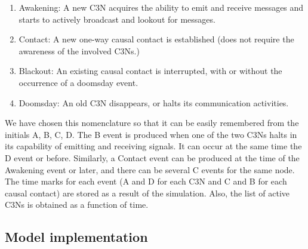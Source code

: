 \documentclass[crop]{CSLB}
\newcommand{\ceti}{C3N}
\newcommand{\cetis}{C3Ns}
\newcommand{\blackout}{B event }
\newcommand{\doomsday}{D event }
\newcommand{\aawakening}{Awakening event }
\newcommand{\ccontact}{Contact event }
\newcommand{\contacts}{C events }
\begin{document}
\begin{enumerate}
   \item[(A)] Awakening: A new \ceti{} acquires the ability to emit
      and receive messages and starts to actively broadcast and
      lookout for messages.
   \item[(C)] Contact: A new one-way causal contact is established
      (does not require the awareness of the involved \cetis{}.)
   \item[(B)] Blackout: An existing causal contact is interrupted,
      with or without the occurrence of a doomsday event.
   \item[(D)] Doomsday: An old \ceti{} disappears, or halts its
      communication activities.
\end{enumerate}

We have chosen this nomenclature so that it can be easily remembered
from the initials A, B, C, D.
%
The \blackout is produced when one of the two \cetis{} halts in its
capability of emitting and receiving signals.
%
It can occur at the same time the \doomsday or before.
%
Similarly, a \ccontact can be produced at the time of the \aawakening
or later, and there can be several \contacts for the same node.
%
The time marks for each event (A and D for each \ceti{} and C and B
for each causal contact) are stored as a result of the simulation.
%
Also, the list of active \cetis{} is obtained as a function of time.
%



%


\subsection{Model implementation}
\end{document}
